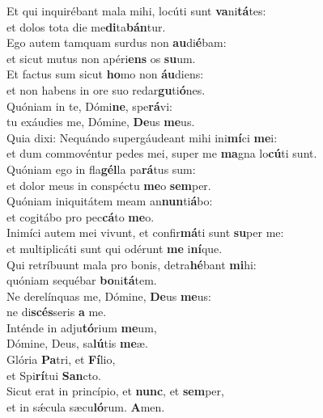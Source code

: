 \oddverse Et qui inquirébant mala mihi, locúti sunt \textbf{va}ni\textbf{tá}tes:~\*\\
\oddverse et dolos tota die me\textbf{di}ta\textbf{bán}tur.\\
\evenverse Ego autem tamquam surdus non \textbf{au}di\textbf{é}bam:~\*\\
\evenverse et sicut mutus non apéri\textbf{ens} os \textbf{su}um.\\
\oddverse Et factus sum sicut \textbf{ho}mo non \textbf{áu}diens:~\*\\
\oddverse et non habens in ore suo redar\textbf{gu}ti\textbf{ó}nes.\\
\evenverse Quóniam in te, Dómi\textbf{ne}, spe\textbf{rá}vi:~\*\\
\evenverse tu exáudies me, Dómine, \textbf{De}us \textbf{me}us.\\
\oddverse Quia dixi: Nequándo supergáudeant mihi ini\textbf{mí}ci \textbf{me}i:~\*\\
\oddverse et dum commovéntur pedes mei, super me \textbf{ma}gna lo\textbf{cú}ti sunt.\\
\evenverse Quóniam ego in fla\textbf{gél}la pa\textbf{rá}tus sum:~\*\\
\evenverse et dolor meus in conspéctu \textbf{me}o \textbf{sem}per.\\
\oddverse Quóniam iniquitátem meam an\textbf{nun}ti\textbf{á}bo:~\*\\
\oddverse et cogitábo pro pec\textbf{cá}to \textbf{me}o.\\
\evenverse Inimíci autem mei vivunt, et confir\textbf{má}ti sunt \textbf{su}per me:~\*\\
\evenverse et multiplicáti sunt qui odérunt \textbf{me} i\textbf{ní}que.\\
\oddverse Qui retríbuunt mala pro bonis, detra\textbf{hé}bant \textbf{mi}hi:~\*\\
\oddverse quóniam sequébar \textbf{bo}ni\textbf{tá}tem.\\
\evenverse Ne derelínquas me, Dómine, \textbf{De}us \textbf{me}us:~\*\\
\evenverse ne di\textbf{scés}seris \textbf{a} me.\\
\oddverse Inténde in adju\textbf{tó}rium \textbf{me}um,~\*\\
\oddverse Dómine, Deus, sa\textbf{lú}tis \textbf{me}æ.\\
\evenverse Glória \textbf{Pa}tri, et \textbf{Fí}lio,~\*\\
\evenverse et Spi\textbf{rí}tui \textbf{San}cto.\\
\oddverse Sicut erat in princípio, et \textbf{nunc}, et \textbf{sem}per,~\*\\
\oddverse et in sǽcula sæcu\textbf{ló}rum. \textbf{A}men.\\
